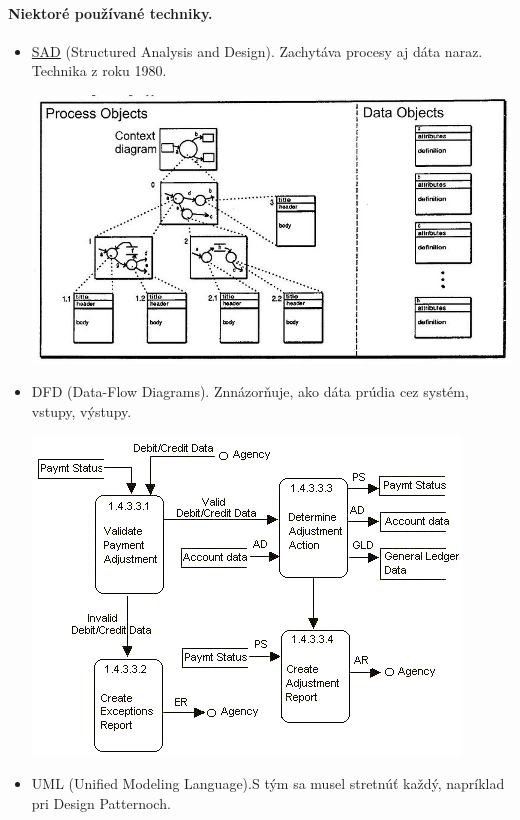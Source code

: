 \documentclass[10pt,a4paper]{article}
\begin{document}
\paragraph{Niektoré používané techniky.}
\begin{itemize}
\item \href{http://en.wikipedia.org/wiki/Structured_analysis}{SAD} (Structured Analysis and Design). Zachytáva procesy aj dáta naraz. Technika z roku 1980.
\begin{center}
\includegraphics[scale=0.5]{db_sad.jpg}
\end{center}
\item DFD (Data-Flow Diagrams). Znnázorňuje, ako dáta prúdia cez systém, vstupy, výstupy. 
\begin{center}
\includegraphics[scale=0.5]{db_dfd.png}
\end{center}
\item UML (Unified Modeling Language).S tým sa musel stretnúť každý, napríklad pri Design Patternoch. 
\begin{center}

\end{center}
\end{itemize}
\end{document}
